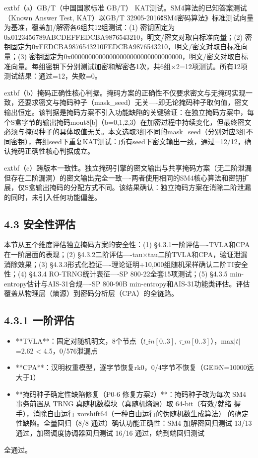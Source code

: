 \documentclass[journal]{IEEEtran}
\begin{document}
	extbf{（a）GB/T（中国国家标准 GB/T） KAT测试}。SM4算法的已知答案测试（Known Answer Test, KAT）以GB/T 32905-2016《SM4密码算法》标准测试向量为基准，覆盖加/解密各6组共12组测试：(1) 密钥固定为0x0123456789ABCDEFFEDCBA9876543210，明文/密文对取自标准向量；(2) 密钥固定为0xFEDCBA9876543210FEDCBA9876543210，明文/密文对取自标准向量；(3) 密钥固定为0x00000000000000000000000000000000，明文/密文对取自标准向量。每组密钥下分别测试加密和解密各1次，共6组$\times$2=12项测试。所有12项测试结果：通过=12，失败=0。

	extbf{（b）掩码正确性核心判据}。掩码方案的正确性不仅要求密文与无掩码实现一致，还要求密文与掩码种子（mask\_seed）无关----即无论掩码种子取何值，密文输出恒定。该判据是掩码方案不引入功能缺陷的关键验证：在独立掩码方案中，每个S盒字节的输出掩码mout8[b]（b=0,1,2,3）在加密过程中持续变化，但最终密文必须与掩码种子的具体取值无关。本文选取3组不同的mask\_seed（分别对应3组不同密钥），每组seed下重复KAT测试：所有seed下密文输出一致，通过=12/12，确认掩码正确性核心判据成立。

	extbf{（c）跨版本一致性}。独立掩码引擎的密文输出与共享掩码方案（无二阶泄漏但存在二阶漏洞）的密文输出完全一致----两者使用相同的SM4核心算法和密钥扩展，仅S盒输出掩码的分配方式不同。该结果确认：独立掩码方案在消除二阶泄漏的同时，未引入任何功能偏差。

%


\subsection{4.3 安全性评估}

本节从五个维度评估独立掩码方案的安全性：(1) §4.3.1一阶评估----TVLA和CPA在一阶层面的表现；(2) §4.3.2二阶评估----tau$\times$tau二阶TVLA和CPA，验证泄漏消除效果；(3) §4.3.3形式化验证----理论证明+10,000组随机采样确认二阶TI安全性；(4) §4.3.4 RO-TRNG统计表征----SP 800-22全套15项测试；(5) §4.3.5 min-entropy估计与AIS-31合规----SP 800-90B min-entropy和AIS-31功能类评估。评估覆盖从物理层（熵源）到密码分析层（CPA）的全链路。

\subsection{4.3.1 一阶评估}

\begin{itemize}
\item **TVLA**：固定对随机明文，8个节点（$t\_in[0..3]$, $\tau\_m[0..3]$），max$|t|$=2.62 < 4.5，0/576泄漏点
\item **CPA**：汉明权重模型，逐字节恢复rk0，0/4字节不恢复（GE@N=10000远大于1）
\item **掩码种子确定性缺陷修复（P0-6 修复方案2）**：掩码种子改为每次 SM4 事务前置从 TRNG 真随机数模块（真随机熵源）取 64-bit（有效/就绪 握手），消除自由运行 xorshift64（一种自由运行的伪随机数生成算法） 的确定性缺陷。全量回归（8/8 通过）确认功能正确性：SM4 加解密回归测试 13/13 通过，加密调度协调器回归测试 16/16 通过，端到端回归测试
\end{itemize} 全通过。
\end{document}
